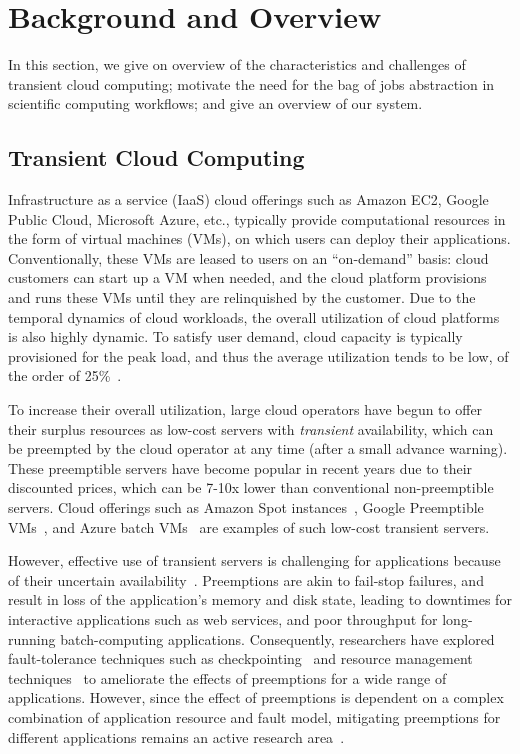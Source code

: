 \section{Background and Overview}

In this section, we give on overview of the characteristics and challenges of transient cloud computing; motivate the need for the bag of jobs abstraction in scientific computing workflows; and give an overview of our \sysname system. 


\subsection{Transient Cloud Computing}

Infrastructure as a service (IaaS) cloud offerings such as Amazon EC2, Google Public Cloud, Microsoft Azure, etc., typically provide computational resources in the form of virtual machines (VMs), on which users can deploy their applications.
Conventionally, these VMs are leased to users on an ``on-demand'' basis: cloud customers can start up a VM when needed, and the cloud platform provisions and runs these VMs until they are relinquished by the customer. 
Due to the temporal dynamics of cloud workloads, the overall utilization of cloud platforms is also highly dynamic. 
To satisfy user demand, cloud capacity is typically provisioned for the peak load, and thus the average utilization tends to be low, of the order of 25\%~\cite{borg,resource-central-sosp17}. 


To increase their overall utilization, large cloud operators have begun to offer their surplus resources as low-cost servers with \emph{transient} availability, which can be preempted by the cloud operator at any time (after a small advance warning). 
These preemptible servers have become popular in recent years due to their discounted prices, which can be 7-10x lower than conventional non-preemptible servers. 
Cloud offerings such as Amazon Spot instances~\cite{spot-web}, Google Preemptible VMs~\cite{preemptible}, and Azure batch VMs~\cite{azure-batch} are examples of such low-cost transient servers. 


However, effective use of transient servers is challenging for applications because of their uncertain availability~\cite{spotcheck, prateek-thesis}. 
Preemptions are akin to fail-stop failures, and result in loss of the application's memory and disk state, leading to downtimes for interactive applications such as web services, and poor throughput for long-running batch-computing applications. 
Consequently, researchers have explored fault-tolerance techniques such as checkpointing~\cite{flint, marathe2014exploiting, spoton} and resource management techniques~\cite{exosphere} to ameliorate the effects of preemptions for a wide range of applications. 
However, since the effect of preemptions is dependent on a complex combination of application resource and fault model, mitigating preemptions for different applications remains an active research area~\cite{eurosys19-graph}. 






